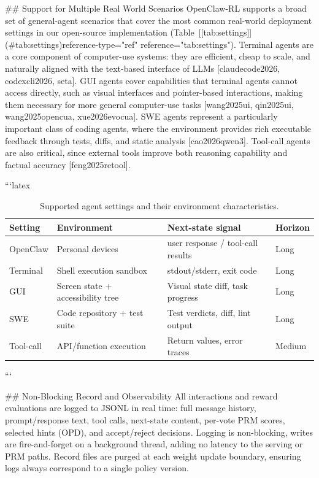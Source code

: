 ## Support for Multiple Real World Scenarios
OpenClaw-RL supports a broad set of general-agent scenarios that cover the most common real-world deployment settings in our open-source implementation (Table [[tab:settings]](#tab:settings)reference-type="ref" reference="tab:settings"). Terminal agents are a core component of computer-use systems: they are efficient, cheap to scale, and naturally aligned with the text-based interface of LLMs [claudecode2026, codexcli2026, seta]. GUI agents cover capabilities that terminal agents cannot access directly, such as visual interfaces and pointer-based interactions, making them necessary for more general computer-use tasks [wang2025ui, qin2025ui, wang2025opencua, xue2026evocua]. SWE agents represent a particularly important class of coding agents, where the environment provides rich executable feedback through tests, diffs, and static analysis [cao2026qwen3]. Tool-call agents are also critical, since external tools improve both reasoning capability and factual accuracy [feng2025retool].


```latex
\begin{table}[h]
\centering
\small
\caption{Supported agent settings and their environment characteristics.}
\label{tab:settings}
\begin{tabular}{@{}llll@{}}
\toprule
\textbf{Setting} & \textbf{Environment} & \textbf{Next-state signal} & \textbf{Horizon} \\
\midrule
OpenClaw & Personal devices & user response / tool-call results & Long \\
Terminal & Shell execution sandbox & stdout/stderr, exit code & Long \\
GUI & Screen state + accessibility tree & Visual state diff, task progress & Long \\
SWE & Code repository + test suite & Test verdicts, diff, lint output & Long \\
Tool-call & API/function execution & Return values, error traces & Medium \\
\bottomrule
\end{tabular}
\end{table}
```


## Non-Blocking Record and Observability
All interactions and reward evaluations are logged to JSONL in real time: full message history, prompt/response text, tool calls, next-state content, per-vote PRM scores, selected hints (OPD), and accept/reject decisions. Logging is non-blocking, writes are fire-and-forget on a background thread, adding no latency to the serving or PRM paths. Record files are purged at each weight update boundary, ensuring logs always correspond to a single policy version.

